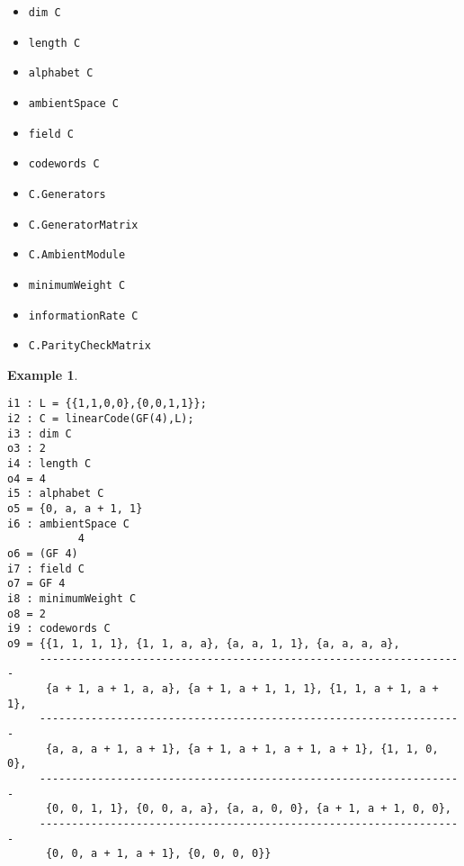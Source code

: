 \documentclass[12pt]{amsart}
\theoremstyle{plain}
\newtheorem{example}[theorem]{Example}
\begin{document}
\begin{minipage}[t]{0.3\textwidth}
\begin{itemize}[leftmargin=0.5 cm]
\item {\tt dim C}
\item {\tt length C}
\item {\tt alphabet C}
\item {\tt ambientSpace C}
\end{itemize}
\end{minipage}
\begin{minipage}[t]{0.32\textwidth}
\begin{itemize}[leftmargin=0.35 cm]
\item {\tt field C}
\item {\tt codewords C}
\item {\tt C.Generators}
\item {\tt C.GeneratorMatrix}
\end{itemize}
\end{minipage}
\begin{minipage}[t]{0.35\textwidth}
\begin{itemize}[leftmargin=0.55 cm]
\item {\tt C.AmbientModule}
\item {\tt minimumWeight C}
\item {\tt informationRate C}
\item {\tt C.ParityCheckMatrix}
\end{itemize}
\end{minipage}
\newpage
\begin{example}
$\,$
\begin{verbatim}
i1 : L = {{1,1,0,0},{0,0,1,1}};
i2 : C = linearCode(GF(4),L);
i3 : dim C
o3 : 2
i4 : length C
o4 = 4
i5 : alphabet C
o5 = {0, a, a + 1, 1}
i6 : ambientSpace C
           4
o6 = (GF 4)
i7 : field C
o7 = GF 4
i8 : minimumWeight C
o8 = 2
i9 : codewords C
o9 = {{1, 1, 1, 1}, {1, 1, a, a}, {a, a, 1, 1}, {a, a, a, a}, 
     ------------------------------------------------------------------
      {a + 1, a + 1, a, a}, {a + 1, a + 1, 1, 1}, {1, 1, a + 1, a + 1},
     ------------------------------------------------------------------
      {a, a, a + 1, a + 1}, {a + 1, a + 1, a + 1, a + 1}, {1, 1, 0, 0},
     ------------------------------------------------------------------
      {0, 0, 1, 1}, {0, 0, a, a}, {a, a, 0, 0}, {a + 1, a + 1, 0, 0}, 
     ------------------------------------------------------------------
      {0, 0, a + 1, a + 1}, {0, 0, 0, 0}}
\end{verbatim}
\end{example}
\end{document}

